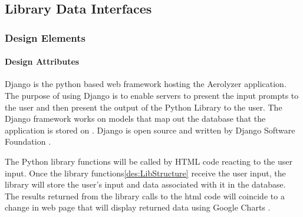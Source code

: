 \documentclass[onecolumn, draftclsnofoot,10pt, compsoc]{IEEEtran}
\begin{document}
\begin{singlespace}
	\subsection{Library Data Interfaces}
      \subsubsection{Design Elements}
          \paragraph{Design Attributes}
          Django is the python based web framework hosting the Aerolyzer application\cite{DjangoStart}.
          The purpose of using Django is to enable servers to present the input prompts to the user and then present the output of the Python Library to the user.
          The Django framework works on models that map out the database that the application is stored on \cite{DjangoDoc}.
          Django is open source and written by Django Software Foundation \cite{DjangoOver}.
		  
          The Python library functions will be called by HTML code reacting to the user input.
		  Once the library functions\ref{des:LibStructure} receive the user input, the library will store the user’s input and data associated with it in the database.
		  The results returned from the library calls to the html code will coincide to a change in web page that will display returned data using Google Charts \cite{GoogleCh}.

\end{singlespace}
\end{document}
